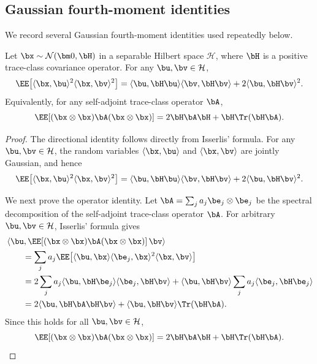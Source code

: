 \documentclass[11pt]{article}
\begin{document}
\subsection{Gaussian fourth-moment identities}
\label{app:subsec:gaussian-fourth-moment}

We record several Gaussian fourth-moment identities used repeatedly below.

\begin{lemma}
\label{app:lem:gaussian-fourth-moment}
Let \(\bx\sim\mathcal N(\bm0,\bH)\) in a separable Hilbert space \(\mathcal H\), where \(\bH\) is a positive trace-class covariance operator. For any \(\bu,\bv\in\mathcal H\),
\begin{equation}
\label{app:eq:gaussian-fourth-moment-directional}
\EE\!\left[\langle\bx,\bu\rangle^2\langle\bx,\bv\rangle^2\right]
=
\langle\bu,\bH\bu\rangle\langle\bv,\bH\bv\rangle
+
2\langle\bu,\bH\bv\rangle^2.
\end{equation}
Equivalently, for any self-adjoint trace-class operator \(\bA\),
\begin{equation}
\label{app:eq:gaussian-fourth-moment}
\EE\!\left[(\bx\otimes\bx)\bA(\bx\otimes\bx)\right]
=
2\bH\bA\bH+\bH\Tr(\bH\bA).
\end{equation}
% 
\end{lemma}

\begin{proof}
The directional identity follows directly from Isserlis' formula. For any \(\bu,\bv\in\mathcal H\), the random variables \(\langle\bx,\bu\rangle\) and \(\langle\bx,\bv\rangle\) are jointly Gaussian, and hence
\[
\EE\!\left[\langle\bx,\bu\rangle^2\langle\bx,\bv\rangle^2\right]
=
\langle\bu,\bH\bu\rangle\langle\bv,\bH\bv\rangle
+
2\langle\bu,\bH\bv\rangle^2.
\]

We next prove the operator identity. Let \(\bA=\sum_j a_j\be_j\otimes\be_j\) be the spectral decomposition of the self-adjoint trace-class operator \(\bA\). For arbitrary \(\bu,\bv\in\mathcal H\), Isserlis' formula gives
\begin{align*}
&\left\langle
\bu,
\EE\!\left[(\bx\otimes\bx)\bA(\bx\otimes\bx)\right]
\bv
\right\rangle\\
&\qquad=
\sum_j a_j
\EE\!\left[
\langle\bu,\bx\rangle
\langle\be_j,\bx\rangle^2
\langle\bx,\bv\rangle
\right]\\
&\qquad=
2\sum_j a_j
\langle\bu,\bH\be_j\rangle
\langle\be_j,\bH\bv\rangle
+
\langle\bu,\bH\bv\rangle
\sum_j a_j\langle\be_j,\bH\be_j\rangle\\
&\qquad=
2\langle\bu,\bH\bA\bH\bv\rangle
+
\langle\bu,\bH\bv\rangle\Tr(\bH\bA).
\end{align*}
Since this holds for all \(\bu,\bv\in\mathcal H\),
\[
\EE\!\left[(\bx\otimes\bx)\bA(\bx\otimes\bx)\right]
=
2\bH\bA\bH+\bH\Tr(\bH\bA).
\]
\end{proof}
\end{document}
